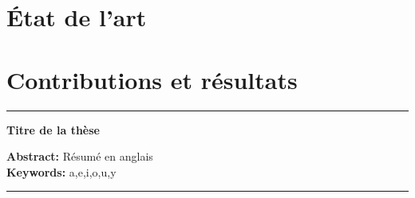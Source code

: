 \documentclass[11pt,twoside, french]{StyleThese}
\begin{document}
\printglossary[type=main]           %
\printglossary[type=\acronymtype]   %




\mainmatter

%




\part{État de l'art}


\part{Contributions et résultats}




\appendix



%
%



\begin{multicols}{2}[\printbibheading]
\printbibliography[sorting=none, heading=bibliography, heading=none]
\end{multicols}

  \printindex


\cleardoublepage

\begin{vcenterpage}
\noindent\rule[2pt]{\textwidth}{0.5pt}
\begin{center}
{\large\textbf{Titre de la thèse\\}}
\end{center}
{\large\textbf{Abstract:}}
Résumé en anglais
\\
{\large\textbf{Keywords:}}
a,e,i,o,u,y
\\
\noindent\rule[2pt]{\textwidth}{0.5pt}
\end{vcenterpage}
\end{document}
